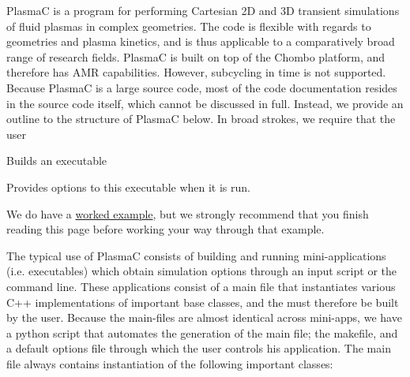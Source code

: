 PlasmaC is a program for performing Cartesian 2D and 3D transient simulations of fluid plasmas in complex geometries. The code is flexible with regards to geometries and plasma kinetics, and is thus applicable to a comparatively broad range of research fields. PlasmaC is built on top of the Chombo platform, and therefore has A\+MR capabilities. However, subcycling in time is not supported. Because PlasmaC is a large source code, most of the code documentation resides in the source code itself, which cannot be discussed in full. Instead, we provide an outline to the structure of PlasmaC below. In broad strokes, we require that the user


\begin{DoxyItemize}
\item Builds an executable
\item Provides options to this executable when it is run.
\end{DoxyItemize}

We do have a \hyperlink{worked-example}{worked example}, but we strongly recommend that you finish reading this page before working your way through that example.

The typical use of PlasmaC consists of building and running mini-\/applications (i.\+e. executables) which obtain simulation options through an input script or the command line. These applications consist of a main file that instantiates various C++ implementations of important base classes, and the must therefore be built by the user. Because the main-\/files are almost identical across mini-\/apps, we have a python script that automates the generation of the main file; the makefile, and a default options file through which the user controls his application. The main file always contains instantiation of the following important classes\+:


